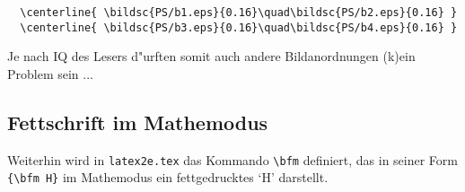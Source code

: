 \begin{verbatim}
  \centerline{ \bildsc{PS/b1.eps}{0.16}\quad\bildsc{PS/b2.eps}{0.16} }
  \centerline{ \bildsc{PS/b3.eps}{0.16}\quad\bildsc{PS/b4.eps}{0.16} }
\end{verbatim}

Je nach IQ des Lesers d"urften somit auch andere Bildanordnungen (k)ein Problem sein ...

\subsection{Fettschrift im Mathemodus}

Weiterhin wird in {\tt latex2e.tex} das Kommando \verb+\bfm+ definiert,
das in seiner Form \verb+{\bfm H}+ im Mathemodus ein fettgedrucktes `H' darstellt.



